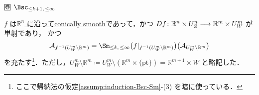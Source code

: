 \documentclass[TQFT_main]{subfiles}
\begin{document}
\begin{mydef}[label=def:Bsc-induction,breakable]{圏 $\Bsc_{\le k+1,\, \le \infty}$}
\begin{description}
\begin{description}
            $f$ は\hyperref[def:c-smooth-along]{$\mathbb{R}^n$ に沿ってconically smooth}であって，かつ $Df \colon \mathbb{R}^n \times U^n_Z \longrightarrow \mathbb{R}^m \times U^m_W$ が単射であり，
            かつ
            \begin{align}
                \mathcal{A}_{f^{-1}(U^m_W \setminus \mathbb{R}^m)} = \Sm_{\le k,\, \le \infty} \bigl( f|_{f^{-1}(U^m_W \setminus \mathbb{R}^m)} \bigr) \bigl(\mathcal{A}_{U^m_W \setminus \mathbb{R}^m}\bigr)
            \end{align}
            を充たす\footnote{ここで帰納法の仮定\ref{assump:induction-Bsc-Sm}-(3) を暗に使っている．}．ただし，$U^m_W \setminus \mathbb{R}^m \coloneqq U^m_W \setminus (\mathbb{R}^m \times \{\mathrm{pt}\}) = \mathbb{R}^{m+1} \times W$ と略記した．
        \end{description}
        
    \end{description}
\end{mydef}
\end{document}
